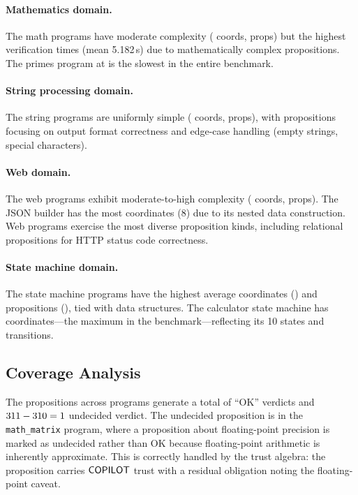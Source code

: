 \documentclass[11pt]{article}
\begin{document}
\paragraph{Mathematics domain.}
The \expDomainMathCount{} math programs have moderate complexity
(\expDomainMathAvgCoords{} coords, \expDomainMathAvgProps{} props)
but the highest verification times (mean 5.182\,s) due to
mathematically complex propositions.  The primes program at
\expTimeMax{} is the slowest in the entire benchmark.

\paragraph{String processing domain.}
The \expDomainStrCount{} string programs are uniformly simple
(\expDomainStrAvgCoords{} coords, \expDomainStrAvgProps{} props),
with propositions focusing on output format correctness and
edge-case handling (empty strings, special characters).

\paragraph{Web domain.}
The \expDomainWebCount{} web programs exhibit moderate-to-high
complexity (\expDomainWebAvgCoords{} coords, \expDomainWebAvgProps{}
props).  The JSON builder has the most coordinates (8) due to its
nested data construction.  Web programs exercise the most diverse
proposition kinds, including relational propositions for HTTP
status code correctness.

\paragraph{State machine domain.}
The \expDomainSmCount{} state machine programs have the highest
average coordinates (\expDomainSmAvgCoords{}) and propositions
(\expDomainSmAvgProps{}), tied with data structures.  The calculator
state machine has \expCoordsMax{} coordinates---the maximum in the
benchmark---reflecting its 10 states and transitions.

\subsection{Coverage Analysis}

The \expPropsSum{} propositions across \expTotalPrograms{} programs
generate a total of \expPropsOkSum{} ``OK'' verdicts and
$311{} - 310{} = 1$ undecided verdict.  The
undecided proposition is in the \texttt{math\_matrix} program,
where a proposition about floating-point precision is marked as
undecided rather than OK because floating-point arithmetic is
inherently approximate.  This is correctly handled by the trust
algebra: the proposition carries $\mathsf{COPILOT}$ trust with a residual
obligation noting the floating-point caveat.
\end{document}
